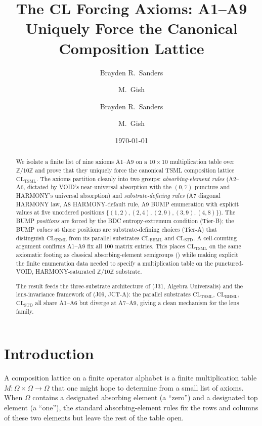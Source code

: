 \documentclass[11pt,reqno]{amsart}
\title[CL Forcing Axioms]
{The CL Forcing Axioms: A1--A9 Uniquely Force the Canonical Composition Lattice}
\author{Brayden R.\ Sanders \and M.\ Gish}
\author{Brayden R.\ Sanders \and M.\ Gish}
\date{\today}
\theoremstyle{plain}
\theoremstyle{definition}
\theoremstyle{remark}
\newcommand{\Z}{\mathbb{Z}}
\newcommand{\TSML}{\mathrm{TSML}}
\newcommand{\BHML}{\mathrm{BHML}}
\begin{document}
\begin{abstract}
We isolate a finite list of nine axioms A1--A9 on a $10\times 10$
multiplication table over $\Z/10\Z$ and prove that they uniquely force
the canonical TSML composition lattice $\mathrm{CL}_{\TSML}$. The axioms
partition cleanly into two groups: \emph{absorbing-element rules}
(A2--A6, dictated by VOID's near-universal absorption with the
$(0,7)$ puncture and HARMONY's universal absorption) and
\emph{substrate-defining rules} (A7 diagonal HARMONY law, A8
HARMONY-default rule, A9 BUMP enumeration with explicit values at five
unordered positions $\{(1,2),(2,4),(2,9),(3,9),(4,8)\}$). The BUMP
\emph{positions} are forced by the BDC entropy-extremum condition
(Tier-B); the BUMP \emph{values} at those positions are
substrate-defining choices (Tier-A) that distinguish $\mathrm{CL}_\TSML$
from its parallel substrates $\mathrm{CL}_\BHML$ and $\mathrm{CL}_\mathrm{STD}$.
A cell-counting argument confirms A1--A9 fix all $100$ matrix entries.
This places $\mathrm{CL}_\TSML$ on the same axiomatic footing as
classical absorbing-element semigroups (\cite{HowieSemigroup}) while
making explicit the finite enumeration data needed to specify a
multiplication table on the punctured-VOID, HARMONY-saturated
$\Z/10\Z$ substrate.

The result feeds the three-substrate architecture of
\cite{SandersGishThreeSubstrate} (J31, Algebra Universalis) and the
lens-invariance framework of \cite{SandersLensInvariance}
(J09, JCT-A): the parallel substrates $\mathrm{CL}_\TSML$,
$\mathrm{CL}_\BHML$, $\mathrm{CL}_\mathrm{STD}$ all share A1--A6 but
diverge at A7--A9, giving a clean mechanism for the lens family.
\end{abstract}

\maketitle

\tableofcontents

\section{Introduction}

A composition lattice on a finite operator alphabet is a finite
multiplication table $M : \Omega \times \Omega \to \Omega$ that one
might hope to determine from a small list of axioms. When $\Omega$
contains a designated absorbing element (a ``zero'') and a designated
top element (a ``one''), the standard absorbing-element rules
\cite{HowieSemigroup, Clifford1961} fix the rows and columns of these
two elements but leave the rest of the table open.
\end{document}
